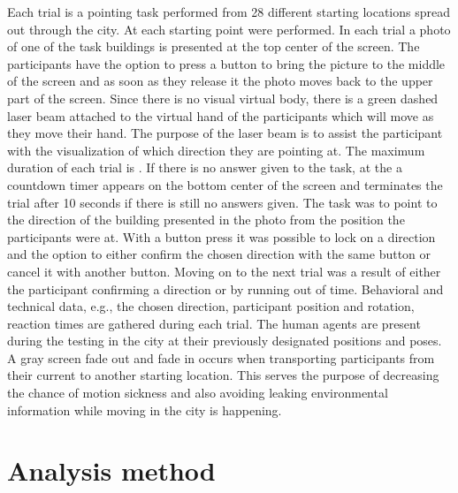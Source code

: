 Each trial is a pointing task performed from 28 different starting locations spread out through the city. At each starting point  were performed. In each trial a photo of one of the task buildings is presented at the top center of the screen. The participants have the option to press a button to bring the picture to the middle of the screen and as soon as they release it the photo moves back to the upper part of the screen. Since there is no visual virtual body, there is a green dashed laser beam attached to the virtual hand of the participants which will move as they move their hand. The purpose of the laser beam is to assist the participant with the visualization of which direction they are pointing at. The maximum duration of each trial is . If there is no answer given to the task, at the  a countdown timer appears on the bottom center of the screen and terminates the trial after 10 seconds if there is still no answers given.
The task was to point to the direction of the building presented in the photo from the position the participants were at. With a button press it was possible to lock on a direction and the option to either confirm the chosen direction with the same button or cancel it with another button. Moving on to the next trial was a result of either the participant confirming a direction or by running out of time. Behavioral and technical data, e.g., the chosen direction, participant position and rotation, reaction times are gathered during each trial. The human agents are present during the testing in the city at their previously designated positions and poses. A gray screen fade out and fade in occurs when transporting participants from their current to another starting location. This serves the purpose of decreasing the chance of motion sickness and also avoiding leaking environmental information while moving in the city is happening.



\section{Analysis method}

